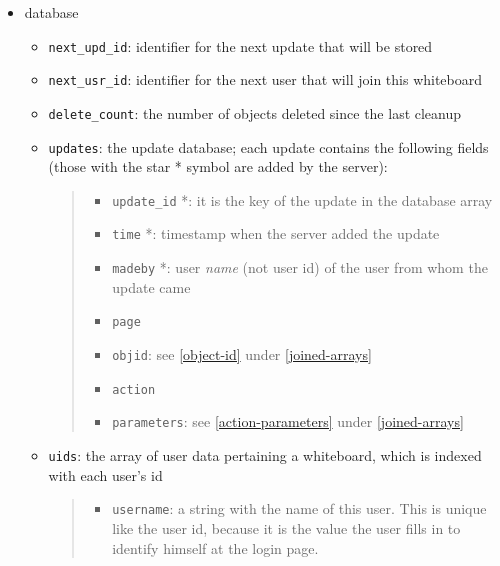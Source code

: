 \documentclass[10pt,a4paper,english]{book}
\begin{document}
\begin{itemize}
\item {} 
database
\begin{itemize}
\item {} 
\texttt{next{\_}upd{\_}id}: identifier for the next update that will be stored

\item {} 
\texttt{next{\_}usr{\_}id}: identifier for the next user that will join this whiteboard

\item {} 
\texttt{delete{\_}count}: the number of objects deleted since the last cleanup

\item {} 
\texttt{updates}\footnotemark[7]: the update database; each update contains the
following fields (those with the star * symbol are added by the
server):
\begin{quote}
\begin{itemize}
\item {} 
\texttt{update{\_}id} *: it is the key of the update in the database array

\item {} 
\texttt{time} *: timestamp when the server added the update

\item {} 
\texttt{madeby} *: user \emph{name} (not user id) of the user from whom the
update came

\item {} 
\texttt{page}

\item {} 
\texttt{objid}: see \href{\#object-id}{\ref*{object-id}} under \href{\#joined-arrays}{\ref*{joined-arrays}}

\item {} 
\texttt{action}

\item {} 
\texttt{parameters}: see \href{\#action-parameters}{\ref*{action-parameters}} under \href{\#joined-arrays}{\ref*{joined-arrays}}

\end{itemize}
\end{quote}

\item {} 
\texttt{uids}: the array of user data pertaining a whiteboard, which is
indexed with each user's id
\begin{quote}
\begin{itemize}
\item {} 
\texttt{username}: a string with the name of this user. This is
unique like the user id, because it is the value the user fills
in to identify himself at the login page.


\end{itemize}
\end{quote}
\end{itemize}
\end{itemize}
\end{document}
